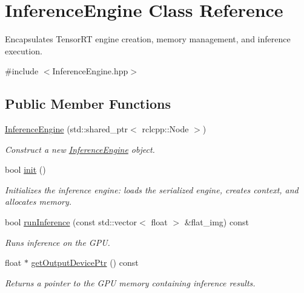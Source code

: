 \hypertarget{classInferenceEngine}{}\section{Inference\+Engine Class Reference}
\label{classInferenceEngine}


Encapsulates Tensor\+RT engine creation, memory management, and inference execution.  




{\ttfamily \#include $<$Inference\+Engine.\+hpp$>$}

\subsection*{Public Member Functions}
\begin{DoxyCompactItemize}
\item 
\hyperlink{classInferenceEngine_a78f278f19b88965dd3bdfb24f5fa1d55}{Inference\+Engine} (std\+::shared\+\_\+ptr$<$ rclcpp\+::\+Node $>$)
\begin{DoxyCompactList}\small\item\em Construct a new \hyperlink{classInferenceEngine}{Inference\+Engine} object. \end{DoxyCompactList}\item 
bool \hyperlink{classInferenceEngine_a6319576a8a3ed00e735f7996cf4e6a48}{init} ()
\begin{DoxyCompactList}\small\item\em Initializes the inference engine\+: loads the serialized engine, creates context, and allocates memory. \end{DoxyCompactList}\item 
bool \hyperlink{classInferenceEngine_aef205091b7d9dd1614e17765c5549144}{run\+Inference} (const std\+::vector$<$ float $>$ \&flat\+\_\+img) const
\begin{DoxyCompactList}\small\item\em Runs inference on the G\+PU. \end{DoxyCompactList}\item 
float $\ast$ \hyperlink{classInferenceEngine_a4d28ceb717d506d3984dc5742dec831d}{get\+Output\+Device\+Ptr} () const
\begin{DoxyCompactList}\small\item\em Returns a pointer to the G\+PU memory containing inference results. \end{DoxyCompactList}\end{DoxyCompactItemize}
